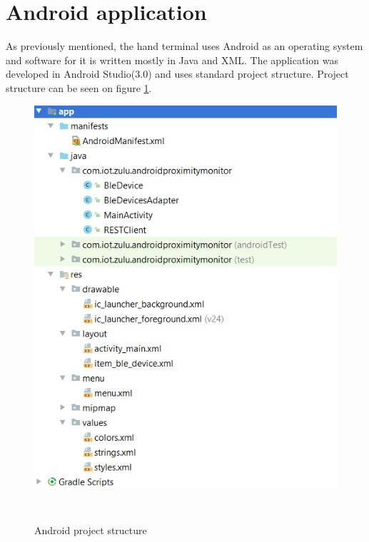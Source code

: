 \section {Android application}
\label {Impl_AndroidNodeSection}

	As previously mentioned, the hand terminal uses Android as an operating system and software for it is written mostly in Java and XML. The application was developed in Android Studio(3.0) and uses standard project structure. Project structure can be seen on figure \ref{fig:AndroidProjectStructure}.

\begin{figure}[H]
\centering
\includegraphics[scale=0.6]{gfx/AndroidProjectStructure}
\caption{Android project structure}~\label{fig:AndroidProjectStructure}
\end{figure}

